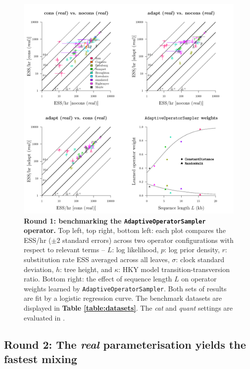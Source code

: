 \documentclass[10pt,letterpaper]{article}
\begin{document}
\begin{figure}[!h]
\includegraphics[width=\textwidth]{benchmarking/benchmarkingVM/ESS_round1_real.pdf}
\caption{\textbf{Round 1: benchmarking the \texttt{AdaptiveOperatorSampler} operator.} Top left, top right, bottom left: each plot compares the ESS/hr ($\pm 2$ standard errors) across two operator configurations with respect to relevant terms -- $L$: log likelihood, $p$: log prior density, $r$: substitution rate ESS averaged across all leaves, $\sigma$: clock standard deviation, $h$: tree height, and $\kappa$: HKY model transition-transversion ratio.
Bottom right: the effect of sequence length $L$ on operator weights learned by \texttt{AdaptiveOperatorSampler}. Both sets of results are fit by a logistic regression curve.
 The benchmark datasets are displayed in \textbf{Table \ref{table:datasets}}. The \emph{cat} and \emph{quant} settings are evaluated in .  }
\label{fig:round1Results}
\end{figure}








\clearpage
\subsection*{Round 2: The \textit{real} parameterisation yields the fastest mixing }
\end{document}
